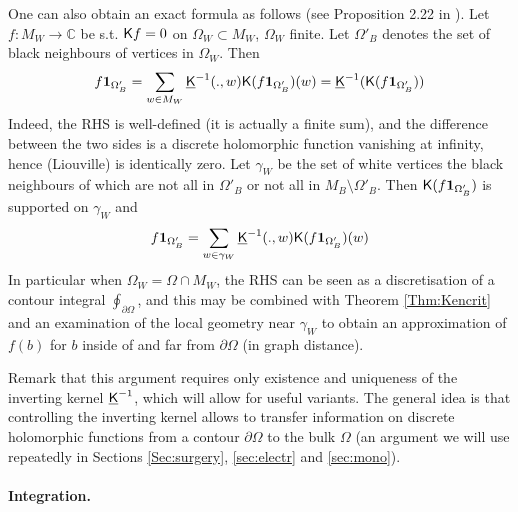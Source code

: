 \documentclass[10pt]{article}
\newcommand{\C}{\mathbb{C}}
\newcommand{\ind}{{\bf 1}}
\newcommand{\rK}{{\sf K}}
\newcommand{\uK}{{\underline {\sf K}}}
\begin{document}
One can also obtain an exact formula as follows (see Proposition 2.22 in \cite{SmiChe_isoradial}). Let $f:M_W\rightarrow\C$ be s.t. $\rK f=0$ on $\Omega_W\subset M_W$, $\Omega_W$ finite. Let $\Omega'_B$ denotes the set of black neighbours of vertices in $\Omega_W$. Then
$$f\ind_{\Omega'_B}=\sum_{w\in M_W}\uK^{-1}(.,w)\rK(f\ind_{\Omega'_B})(w)=\uK^{-1}(\rK(f\ind_{\Omega'_B}))$$
Indeed, the RHS is well-defined (it is actually a finite sum), and the difference between the two sides is a discrete holomorphic function vanishing at infinity, hence (Liouville) is identically zero. Let $\gamma_W$ be the set of white vertices the black neighbours of which are not all in $\Omega'_B$ or not all in $M_B\setminus\Omega'_B$. Then $\rK(f\ind_{\Omega'_B})$ is supported on $\gamma_W$ and
$$f\ind_{\Omega'_B}=\sum_{w\in \gamma_W}\uK^{-1}(.,w)\rK(f\ind_{\Omega'_B})(w)$$
In particular when $\Omega_W=\Omega\cap M_W$, the RHS can be seen as a discretisation of a contour integral $\oint_{\partial\Omega}$, and this may be combined with Theorem \ref{Thm:Kencrit} and an examination of the local geometry near $\gamma_W$ to obtain an approximation of $f(b)$ for $b$ inside of and far from $\partial\Omega$ (in graph distance).

Remark that this argument requires only existence and uniqueness of the inverting kernel $\uK^{-1}$, which will allow for useful variants. The general idea is that controlling the inverting kernel allows to transfer information on discrete holomorphic functions from a contour $\partial\Omega$ to the bulk $\Omega$ (an argument we will use repeatedly in Sections \ref{Sec:surgery}, \ref{sec:electr} and \ref{sec:mono}).


\paragraph{Integration.\\}
\end{document}
